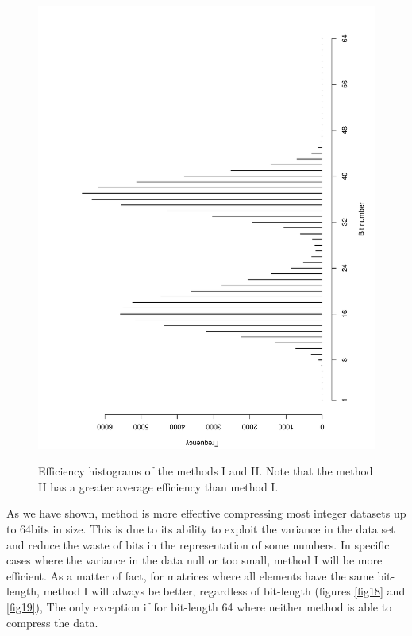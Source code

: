 \documentclass[10pt]{article}
\begin{document}
\begin{figure}[h]
{  \includegraphics[scale=0.4,angle=-90]{fig15}
  \label{fig:15}
  }
  \caption{Efficiency histograms of the methods I and II. Note that the method II has a greater average efficiency than method I.}
  \label{fig:1415}
\end{figure}


As we have shown, method is more effective compressing most integer datasets up to 64bits in size. This is due to its ability to exploit the variance in the data set and reduce the waste of bits in the representation of some numbers. In specific cases where the variance in the data null or too small, method I will be more efficient. As a matter of fact, for matrices where all elements have the same bit-length, method I will always be better, regardless of bit-length (figures \ref{fig18} and \ref{fig19}), The only exception if for bit-length 64 where neither method is able to compress the data. 
\end{document}
